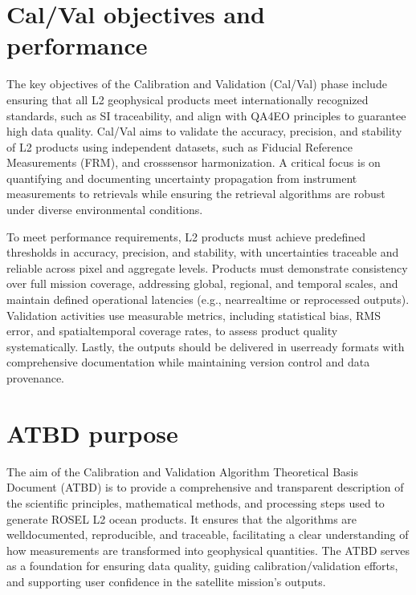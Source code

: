 \documentclass[a4paper,10pt,english]{sphinxmanual}
\begin{document}
\section{Cal/Val objectives and performance}
\label{\detokenize{01_introduction:cal-val-objectives-and-performance}}
\sphinxAtStartPar
The key objectives of the Calibration and Validation (Cal/Val) phase include ensuring that all L2 geophysical products meet internationally recognized standards, such as SI traceability, and align with QA4EO principles to guarantee high data quality. Cal/Val aims to validate the accuracy, precision, and stability of L2 products using independent datasets, such as Fiducial Reference Measurements (FRM), and cross\sphinxhyphen{}sensor harmonization. A critical focus is on quantifying and documenting uncertainty propagation from instrument measurements to retrievals while ensuring the retrieval algorithms are robust under diverse environmental conditions.

\sphinxAtStartPar
To meet performance requirements, L2 products must achieve predefined thresholds in accuracy, precision, and stability, with uncertainties traceable and reliable across pixel and aggregate levels. Products must demonstrate consistency over full mission coverage, addressing global, regional, and temporal scales, and maintain defined operational latencies (e.g., near\sphinxhyphen{}real\sphinxhyphen{}time or reprocessed outputs). Validation activities use measurable metrics, including statistical bias, RMS error, and spatial\sphinxhyphen{}temporal coverage rates, to assess product quality systematically. Lastly, the outputs should be delivered in user\sphinxhyphen{}ready formats with comprehensive documentation while maintaining version control and data provenance.


\section{ATBD purpose}
\label{\detokenize{01_introduction:atbd-purpose}}
\sphinxAtStartPar
The aim of the Calibration and Validation Algorithm Theoretical Basis Document (ATBD) is to provide a comprehensive and transparent description of the scientific principles, mathematical methods, and processing steps used to generate ROSE\sphinxhyphen{}L L2 ocean products. It ensures that the algorithms are well\sphinxhyphen{}documented, reproducible, and traceable, facilitating a clear understanding of how measurements are transformed into geophysical quantities. The ATBD serves as a foundation for ensuring data quality, guiding calibration/validation efforts, and supporting user confidence in the satellite mission’s outputs.
\end{document}
